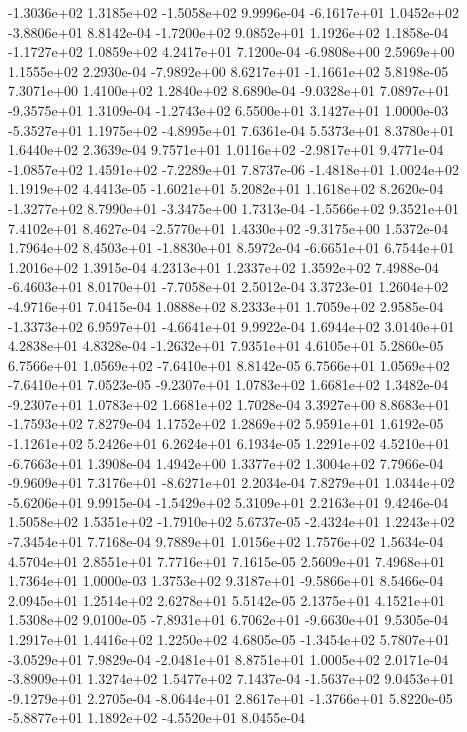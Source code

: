 -1.3036e+02  1.3185e+02 -1.5058e+02  9.9996e-04
-6.1617e+01  1.0452e+02 -3.8806e+01  8.8142e-04
-1.7200e+02  9.0852e+01  1.1926e+02  1.1858e-04
-1.1727e+02  1.0859e+02  4.2417e+01  7.1200e-04
-6.9808e+00  2.5969e+00  1.1555e+02  2.2930e-04
-7.9892e+00  8.6217e+01 -1.1661e+02  5.8198e-05
7.3071e+00 1.4100e+02 1.2840e+02  8.6890e-04
-9.0328e+01  7.0897e+01 -9.3575e+01  1.3109e-04
-1.2743e+02  6.5500e+01  3.1427e+01  1.0000e-03
-5.3527e+01  1.1975e+02 -4.8995e+01  7.6361e-04
5.5373e+01 8.3780e+01 1.6440e+02  2.3639e-04
 9.7571e+01  1.0116e+02 -2.9817e+01  9.4771e-04
-1.0857e+02  1.4591e+02 -7.2289e+01  7.8737e-06
-1.4818e+01  1.0024e+02  1.1919e+02  4.4413e-05
-1.6021e+01  5.2082e+01  1.1618e+02  8.2620e-04
-1.3277e+02  8.7990e+01 -3.3475e+00  1.7313e-04
-1.5566e+02  9.3521e+01  7.4102e+01  8.4627e-04
-2.5770e+01  1.4330e+02 -9.3175e+00  1.5372e-04
 1.7964e+02  8.4503e+01 -1.8830e+01  8.5972e-04
-6.6651e+01  6.7544e+01  1.2016e+02  1.3915e-04
4.2313e+01 1.2337e+02 1.3592e+02  7.4988e-04
-6.4603e+01  8.0170e+01 -7.7058e+01  2.5012e-04
 3.3723e-01  1.2604e+02 -4.9716e+01  7.0415e-04
1.0888e+02 8.2333e+01 1.7059e+02  2.9585e-04
-1.3373e+02  6.9597e+01 -4.6641e+01  9.9922e-04
1.6944e+02 3.0140e+01 4.2838e+01  4.8328e-04
-1.2632e+01  7.9351e+01  4.6105e+01  5.2860e-05
 6.7566e+01  1.0569e+02 -7.6410e+01  8.8142e-05
 6.7566e+01  1.0569e+02 -7.6410e+01  7.0523e-05
-9.2307e+01  1.0783e+02  1.6681e+02  1.3482e-04
-9.2307e+01  1.0783e+02  1.6681e+02  1.7028e-04
 3.3927e+00  8.8683e+01 -1.7593e+02  7.8279e-04
1.1752e+02 1.2869e+02 5.9591e+01  1.6192e-05
-1.1261e+02  5.2426e+01  6.2624e+01  6.1934e-05
 1.2291e+02  4.5210e+01 -6.7663e+01  1.3908e-04
1.4942e+00 1.3377e+02 1.3004e+02  7.7966e-04
-9.9609e+01  7.3176e+01 -8.6271e+01  2.2034e-04
 7.8279e+01  1.0344e+02 -5.6206e+01  9.9915e-04
-1.5429e+02  5.3109e+01  2.2163e+01  9.4246e-04
 1.5058e+02  1.5351e+02 -1.7910e+02  5.6737e-05
-2.4324e+01  1.2243e+02 -7.3454e+01  7.7168e-04
9.7889e+01 1.0156e+02 1.7576e+02  1.5634e-04
4.5704e+01 2.8551e+01 7.7716e+01  7.1615e-05
2.5609e+01 7.4968e+01 1.7364e+01  1.0000e-03
 1.3753e+02  9.3187e+01 -9.5866e+01  8.5466e-04
2.0945e+01 1.2514e+02 2.6278e+01  5.5142e-05
2.1375e+01 4.1521e+01 1.5308e+02  9.0100e-05
-7.8931e+01  6.7062e+01 -9.6630e+01  9.5305e-04
1.2917e+01 1.4416e+02 1.2250e+02  4.6805e-05
-1.3454e+02  5.7807e+01 -3.0529e+01  7.9829e-04
-2.0481e+01  8.8751e+01  1.0005e+02  2.0171e-04
-3.8909e+01  1.3274e+02  1.5477e+02  7.1437e-04
-1.5637e+02  9.0453e+01 -9.1279e+01  2.2705e-04
-8.0644e+01  2.8617e+01 -1.3766e+01  5.8220e-05
-5.8877e+01  1.1892e+02 -4.5520e+01  8.0455e-04
